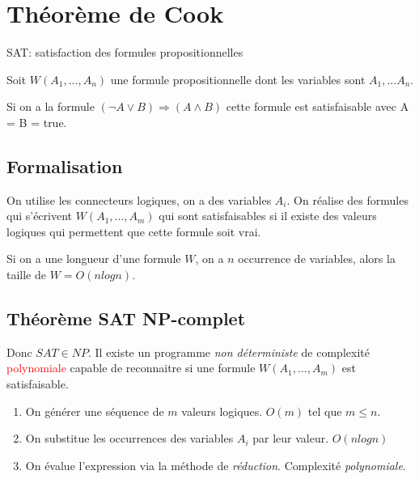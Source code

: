 \documentclass{report}
\begin{document}
\section{Théorème de Cook}
SAT: satisfaction des formules propositionnelles\par
Soit $W(A_1, ..., A_n)$ une formule propositionnelle dont les variables sont $A_1, ... A_n$. \par 
Si on a la formule $(\neg A \vee B ) \Rightarrow (A \wedge B)$ cette formule est satisfaisable avec A = B = true.
\subsection{Formalisation}
On utilise les connecteurs logiques, on a des variables $A_i$. On réalise des formules qui s'écrivent $W(A_1, ... , A_m)$ qui sont satisfaisables si il existe des valeurs logiques qui permettent que cette formule soit vrai.\par 
Si on a une longueur d'une formule $W$, on a $n$ occurrence de variables, alors la taille de $W = O(n log n)$.

\subsection{Théorème SAT NP-complet}
Donc $SAT \in NP$. Il existe un programme \textit{non déterministe} de complexité \textcolor{red}{polynomiale} capable de reconnaitre si une formule $W(A_1, ... , A_m)$ est satisfaisable.
\begin{enumerate}
\item On générer une séquence de $m$ valeurs logiques. $O(m)$ tel que $m \leqslant n$.
\item On substitue les occurrences des variables $A_i$ par leur valeur. $O( n log n)$
\item On évalue l'expression via la méthode de \textit{réduction}. Complexité \textit{polynomiale}.
\end{enumerate}
\end{document}
